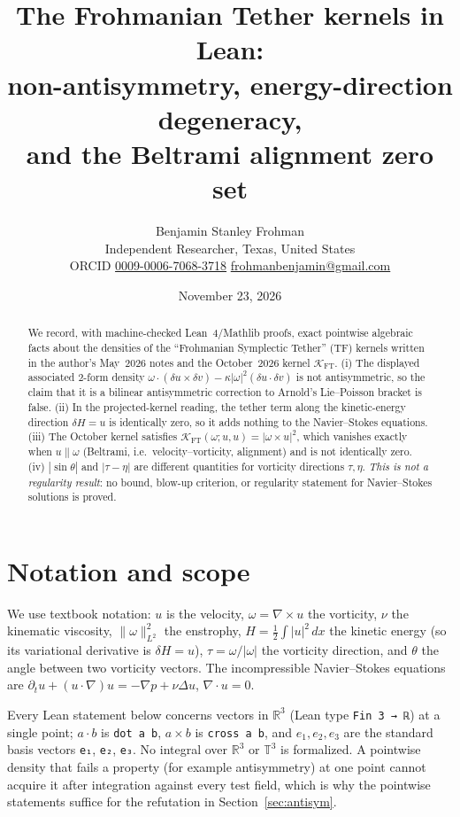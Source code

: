 \documentclass[11pt]{article}
\title{The Frohmanian Tether kernels in Lean:\\
non-antisymmetry, energy-direction degeneracy,\\
and the Beltrami alignment zero set}
\author{Benjamin Stanley Frohman\\
\small Independent Researcher, Texas, United States\\
\small ORCID \href{https://orcid.org/0009-0006-7068-3718}{0009-0006-7068-3718}\quad
\href{mailto:frohmanbenjamin@gmail.com}{frohmanbenjamin@gmail.com}}
\date{November 23, 2026}
\theoremstyle{definition}
\theoremstyle{remark}
\newcommand{\lean}[1]{\texttt{\upshape #1}}
\newcommand{\R}{\mathbb{R}}
\newcommand{\TF}{\mathrm{TF}}
\newcommand{\KFT}{\mathcal{K}_{\mathrm{FT}}}
\begin{document}
\maketitle

\begin{abstract}
We record, with machine-checked Lean~4/Mathlib proofs, exact pointwise
algebraic facts about the densities of the ``Frohmanian Symplectic Tether''
($\TF$) kernels written in the author's May~2026 notes and the October~2026
kernel $\KFT$. (i) The displayed associated 2-form density
$\omega\cdot(\delta u\times\delta v)-\kappa|\omega|^2(\delta u\cdot\delta v)$ is
not antisymmetric, so the claim that it is a bilinear antisymmetric correction
to Arnold's Lie--Poisson bracket is false. (ii) In the projected-kernel reading,
the tether term along the kinetic-energy direction $\delta H=u$ is identically
zero, so it adds nothing to the Navier--Stokes equations. (iii) The October
kernel satisfies $\KFT(\omega;u,u)=|\omega\times u|^2$, which vanishes exactly
when $u\parallel\omega$ (Beltrami, i.e.\ velocity--vorticity, alignment) and is
not identically zero. (iv) $|\sin\theta|$ and $|\tau-\eta|$ are different
quantities for vorticity directions $\tau,\eta$. \emph{This is not a regularity
result}: no bound, blow-up criterion, or regularity statement for Navier--Stokes
solutions is proved.
\end{abstract}

\section{Notation and scope}
We use textbook notation: $u$ is the velocity, $\omega=\nabla\times u$ the
vorticity, $\nu$ the kinematic viscosity, $\|\omega\|_{L^2}^2$ the enstrophy,
$H=\tfrac12\int|u|^2\,dx$ the kinetic energy (so its variational derivative is
$\delta H=u$), $\tau=\omega/|\omega|$ the vorticity direction, and $\theta$ the
angle between two vorticity vectors. The incompressible Navier--Stokes
equations are $\partial_t u+(u\cdot\nabla)u=-\nabla p+\nu\Delta u$,
$\nabla\cdot u=0$.

Every Lean statement below concerns vectors in $\R^3$ (Lean type
\lean{Fin 3 → ℝ}) at a single point; $a\cdot b$ is \lean{dot a b}, $a\times b$ is
\lean{cross a b}, and $e_1,e_2,e_3$ are the standard basis vectors
\lean{e₁}, \lean{e₂}, \lean{e₃}. No integral over $\R^3$ or $\mathbb{T}^3$
is formalized. A pointwise density that fails a property (for example
antisymmetry) at one point cannot acquire it after integration against every
test field, which is why the pointwise statements suffice for the refutation in
Section~\ref{sec:antisym}.
\end{document}
